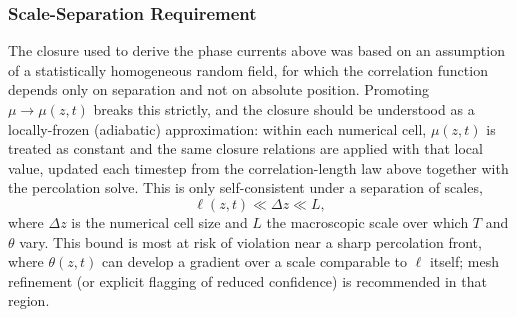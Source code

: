 \documentclass[12pt]{article}
\begin{document}
\subsubsection{Scale-Separation Requirement}

The closure used to derive the phase currents above was based on an
assumption of a statistically homogeneous random field, for which the
correlation function depends only on separation and not on absolute
position. Promoting $\mu \to \mu(z,t)$ breaks this strictly, and the closure
should be understood as a locally-frozen (adiabatic) approximation: within
each numerical cell, $\mu(z,t)$ is treated as constant and the same closure
relations are applied with that local value, updated each timestep from the
correlation-length law above together with the percolation solve. This is
only self-consistent under a separation of scales,
\begin{equation}
    \ell(z,t) \ll \Delta z \ll L,
\end{equation}
where $\Delta z$ is the numerical cell size and $L$ the macroscopic scale
over which $T$ and $\theta$ vary. This bound is most at risk of violation
near a sharp percolation front, where $\theta(z,t)$ can develop a gradient
over a scale comparable to $\ell$ itself; mesh refinement (or explicit
flagging of reduced confidence) is recommended in that region.



\end{document}
